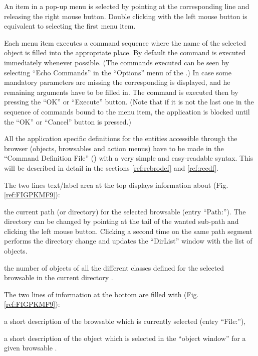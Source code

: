 \begin{UL}
  An item in a pop-up menu is selected by pointing at the corresponding line
  and releasing the right mouse button.
  Double clicking with the left mouse button is equivalent to selecting
  the first menu item.
\vspace{0pt plus2pt}

  Each menu item executes a command sequence where the name of the
  selected object is filled into the appropriate place.
  By default the command is executed immediately whenever possible.
  (The commands executed can be seen by selecting ``Echo Commands''
  in the ``Options'' menu of the \EW{}.)
  In case some mandatory parameters are missing the corresponding \CAP{}
  is displayed, and he remaining arguments have to be filled in.
  The command is executed then by pressing the ``OK'' or ``Execute'' button.
  (Note that if it is not the last one in the sequence of 
  commands bound to the menu item, the application is blocked until the ``OK'' 
  or ``Cancel'' button is pressed.)
\end{UL}

All the application specific definitions for the entities accessible
through the browser (objects, browsables and action menus) have to be made 
in the ``Command Definition File'' (\CDF{}) with a very simple and easy-readable
syntax. 
\ifKUIPman
  This will be described in detail in the sections \ref{ref:rebrodef}
  and \ref{ref:recdf}.
\fi

The two lines text/label area at the top displays 
information about (Fig. \ref{ref:FIGPKMF9}):
\vspace{-.5\baselineskip}
\begin{UL}
\item 
the current path (or directory) for the selected browsable  
(entry ``Path:'').
The directory can be changed by pointing at the tail of the wanted sub-path 
and clicking the left mouse button. Clicking a second time on the same path 
segment performs the directory change and updates the ``DirList'' window 
with the list of objects.
\item
the number of objects of all the different classes defined 
for the selected browsable in the current directory .
\end{UL}

The two lines of information at the bottom are filled with 
(Fig. \ref{ref:FIGPKMF9}):
\vspace{-.5\baselineskip}
\begin{UL}
\item
a short description of the browsable which is currently selected 
 (entry ``File:''), 
\item
a short description of the object which is selected in the ``object 
window'' for a given browsable .
\end{UL}


